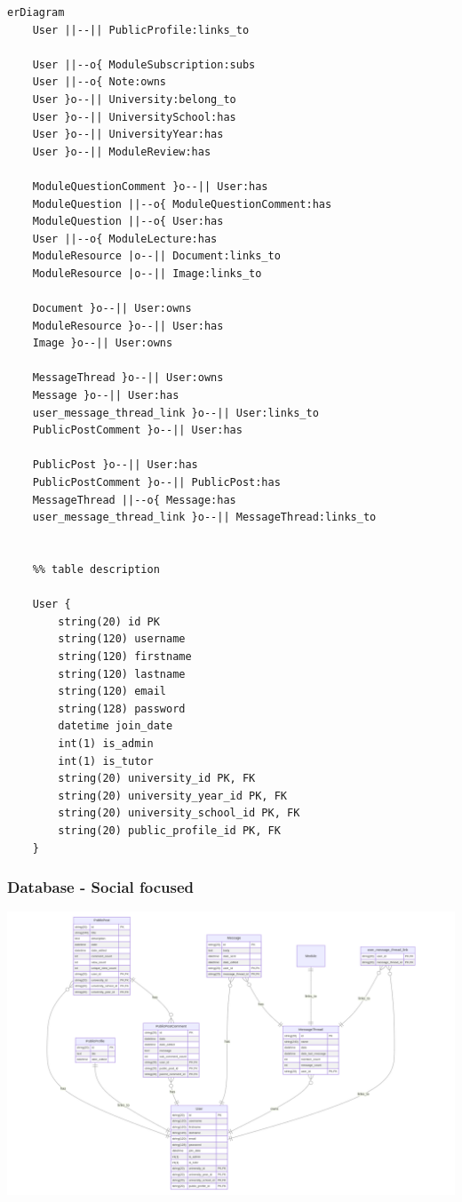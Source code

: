 \begin{lstlisting}
erDiagram 
    User ||--|| PublicProfile:links_to

    User ||--o{ ModuleSubscription:subs
    User ||--o{ Note:owns
    User }o--|| University:belong_to
    User }o--|| UniversitySchool:has
    User }o--|| UniversityYear:has
    User }o--|| ModuleReview:has

    ModuleQuestionComment }o--|| User:has
    ModuleQuestion ||--o{ ModuleQuestionComment:has
    ModuleQuestion ||--o{ User:has
    User ||--o{ ModuleLecture:has
    ModuleResource |o--|| Document:links_to
    ModuleResource |o--|| Image:links_to

    Document }o--|| User:owns
    ModuleResource }o--|| User:has
    Image }o--|| User:owns

    MessageThread }o--|| User:owns
    Message }o--|| User:has
    user_message_thread_link }o--|| User:links_to
    PublicPostComment }o--|| User:has
    
    PublicPost }o--|| User:has
    PublicPostComment }o--|| PublicPost:has
    MessageThread ||--o{ Message:has
    user_message_thread_link }o--|| MessageThread:links_to


    %% table description

    User {
        string(20) id PK
        string(120) username
        string(120) firstname
        string(120) lastname
        string(120) email
        string(128) password
        datetime join_date
        int(1) is_admin
        int(1) is_tutor
        string(20) university_id PK, FK
        string(20) university_year_id PK, FK
        string(20) university_school_id PK, FK
        string(20) public_profile_id PK, FK
    }
\end{lstlisting}

\subsubsection{Database - Social focused}

\includegraphics[scale=0.58, angle=90]{images/database/db_social.png}

